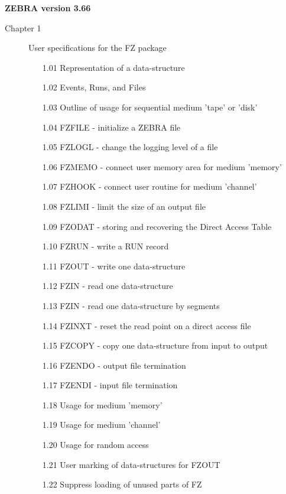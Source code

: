 \markboth{}{}             %
\vspace*{20pt}
\begin{center} {\Large\bf ZEBRA version 3.66} \end{center}
\vspace*{30pt}
\begin{description}
  \item[Chapter 1] User specifications for the FZ package
  \begin{itemize}
     \item[1.01] Representation of a data-structure
     \item[1.02] Events, Runs, and Files
     \item[1.03] Outline of usage for sequential medium 'tape' or 'disk'
     \item[1.04] FZFILE - initialize a ZEBRA file
     \item[1.05] FZLOGL - change the logging level of a file
     \item[1.06] FZMEMO - connect user memory area for medium 'memory'
     \item[1.07] FZHOOK - connect user routine for medium 'channel'
     \item[1.08] FZLIMI - limit the size of an output file
     \item[1.09] FZODAT - storing and recovering the Direct Access Table
     \item[1.10] FZRUN  - write a RUN record
     \item[1.11] FZOUT  - write one data-structure
     \item[1.12] FZIN   - read one data-structure
     \item[1.13] FZIN   - read one data-structure by segments
     \item[1.14] FZINXT - reset the read point on a direct access file
     \item[1.15] FZCOPY - copy one data-structure from input to output
     \item[1.16] FZENDO - output file termination
     \item[1.17] FZENDI - input file termination
     \item[1.18] Usage for medium 'memory'
     \item[1.19] Usage for medium 'channel'
     \item[1.20] Usage for random access
     \item[1.21] User marking of data-structures for FZOUT
     \item[1.22] Suppress loading of unused parts of FZ

\end{itemize}
\end{description}
